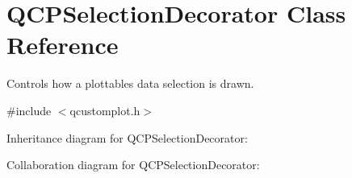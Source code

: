 \hypertarget{class_q_c_p_selection_decorator}{}\section{Q\+C\+P\+Selection\+Decorator Class Reference}
\label{class_q_c_p_selection_decorator}


Controls how a plottable\textquotesingle{}s data selection is drawn.  




{\ttfamily \#include $<$qcustomplot.\+h$>$}



Inheritance diagram for Q\+C\+P\+Selection\+Decorator\+:


Collaboration diagram for Q\+C\+P\+Selection\+Decorator\+:
